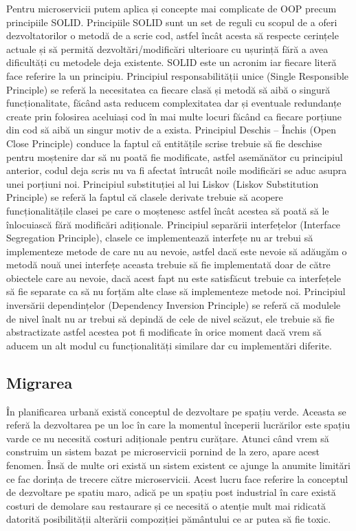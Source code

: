 Pentru microservicii putem aplica și concepte mai complicate de OOP precum principiile SOLID.
Principiile SOLID sunt un set de reguli cu scopul de a oferi dezvoltatorilor o metodă de a
scrie cod, astfel încât acesta să respecte cerințele actuale și să permită dezvoltări/modificări
ulterioare cu ușurință fără a avea dificultăți cu metodele deja existente. SOLID este un acronim
iar fiecare literă face referire la un principiu. Principiul responsabilității unice (Single Responsible
Principle) se referă la necesitatea ca fiecare clasă și metodă să aibă o singură funcționalitate,
făcând asta reducem complexitatea dar și eventuale redundanțe create prin folosirea aceluiași
cod în mai multe locuri făcând ca fiecare porțiune din cod să aibă un singur motiv de a exista.
Principiul Deschis – Închis (Open Close Principle) conduce la faptul că entitățile scrise trebuie să
fie deschise pentru moștenire dar să nu poată fie modificate, astfel asemănător cu principiul
anterior, codul deja scris nu va fi afectat întrucât noile modificări se aduc asupra unei porțiuni
noi. Principiul substituției al lui Liskov (Liskov Substitution Principle) se referă la faptul că clasele
derivate trebuie să acopere funcționalitățile clasei pe care o moștenesc astfel încât acestea să
poată să le înlocuiască fără modificări adiționale. Principiul separării interfețelor (Interface
Segregation Principle), clasele ce implementează interfețe nu ar trebui să implementeze metode
de care nu au nevoie, astfel dacă este nevoie să adăugăm o metodă nouă unei interfețe aceasta
trebuie să fie implementată doar de către obiectele care au nevoie, dacă acest fapt nu este
satisfăcut trebuie ca interfețele să fie separate ca să nu forțăm alte clase să implementeze
metode noi. Principiul inversării dependințelor (Dependency Inversion Principle) se referă că
modulele de nivel înalt nu ar trebui să depindă de cele de nivel scăzut, ele trebuie să fie
abstractizate astfel acestea pot fi modificate în orice moment dacă vrem să aducem un alt modul
cu funcționalități similare dar cu implementări diferite.\cite{temasolid}

\subsection{Migrarea}

În planificarea urbană există conceptul de dezvoltare pe spațiu verde. Aceasta se referă 
la dezvoltarea pe un loc în care la momentul începerii lucrărilor este spațiu varde ce nu necesită
costuri adiționale pentru curățare. Atunci când vrem să construim un sistem bazat pe microservicii
pornind de la zero, apare acest fenomen. Însă de multe ori există un sistem existent ce ajunge
la anumite limitări ce fac dorința de trecere către microservicii. Acest lucru face referire la 
conceptul de dezvoltare pe spatiu maro, adică pe un spațiu post industrial în care există costuri de 
demolare sau restaurare și ce necesită o atenție mult mai ridicată datorită posibilității alterării
compoziției pământului ce ar putea să fie toxic.

